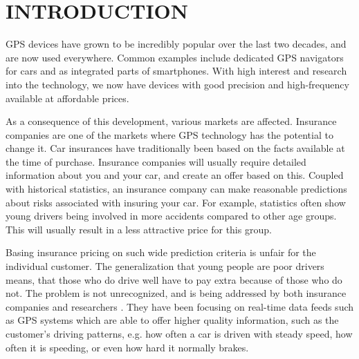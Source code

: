 \section{INTRODUCTION}
\label{sec:intro}

GPS devices have grown to be incredibly popular over the last two decades, and are now used everywhere. Common examples include dedicated GPS navigators for cars and as integrated parts of smartphones. With high interest and research into the technology, we now have devices with good precision and high-frequency available at affordable prices\cite{art:telematicsmatter}.

As a consequence of this development, various markets are affected. Insurance companies are one of the markets where GPS technology has the potential to change it. Car insurances have traditionally been based on the facts available at the time of purchase. Insurance companies will usually require detailed information about you and your car, and create an offer based on this. Coupled with historical statistics, an insurance company can make reasonable predictions about risks associated with insuring your car. For example, statistics often show young drivers being involved in more accidents compared to other age groups\cite{url:forbes}\cite{accidents}. This will usually result in a less attractive price for this group.

Basing insurance pricing on such wide prediction criteria is unfair for the individual customer. The generalization that young people are poor drivers means, that those who do drive well have to pay extra because of those who do not. The problem is not unrecognized, and is being addressed by both insurance companies and researchers \cite{mar:ubi16}. They have been focusing on real-time data feeds such as GPS systems which are able to offer higher quality information, such as the customer's driving patterns, e.g. how often a car is driven with steady speed, how often it is speeding, or even how hard it normally brakes.
%

